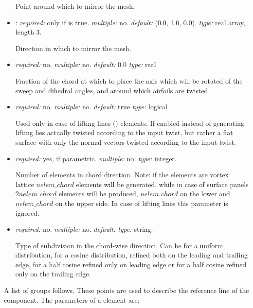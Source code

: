 \begin{itemize}
Point around which to mirror the mesh.

\item {}: \textit{required:} only if  is true. \textit{multiple:} no. \textit{default:} (0.0, 1.0, 0.0). \textit{type:} real array, length 3.

Direction in which to mirror the mesh.

\item {} \textit{required:} no. \textit{multiple:} no. \textit{default:} 0.0 \textit{type:} real

Fraction of the chord at which to place the axis which will be rotated of the sweep and dihedral angles, and around which airfoils are twisted. 

\item {} \textit{required:} no. \textit{multiple:} no. \textit{default:} true \textit{type:} logical

Used only in case of lifting lines () elements. If enabled instead of generating lifting lies actually twisted according to the input twist, but rather a flat surface with only the normal vectors twisted according to the input twist. 

\item {} \textit{required:} yes, if parametric. \textit{multiple:} no. \textit{type:} integer.

Number of elements in chord direction. Note: if the elements are vortex lattice $nelem\_chord$ elements will be generated, while in case of surface panels $2nelem\_chord$ elements will be produced, $nelem\_chord$ on the lower and $nelem\_chord$ on the upper side. In case of lifting lines this parameter is ignored.

\item {} \textit{required:} no. \textit{multiple:} no. \textit{default:}  \textit{type:} string.

Type of subdivision in the chord-wise direction. Can be  for a uniform distribution,  for a cosine distribution, refined both on the leading and trailing edge,  for a half cosine refined only on leading edge or  for a half cosine refined only on the trailing edge. 

\end{itemize}
%
A list of  groups follows. These points are used to describe the reference line of the component. The parameters of a  element are:

